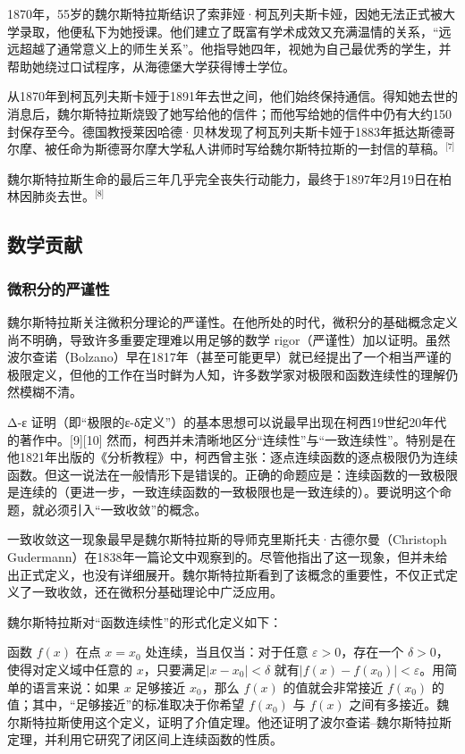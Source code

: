 1870年，55岁的魏尔斯特拉斯结识了索菲娅·柯瓦列夫斯卡娅，因她无法正式被大学录取，他便私下为她授课。他们建立了既富有学术成效又充满温情的关系，“远远超越了通常意义上的师生关系”。他指导她四年，视她为自己最优秀的学生，并帮助她绕过口试程序，从海德堡大学获得博士学位。

从1870年到柯瓦列夫斯卡娅于1891年去世之间，他们始终保持通信。得知她去世的消息后，魏尔斯特拉斯烧毁了她写给他的信件；而他写给她的信件中仍有大约150封保存至今。德国教授莱因哈德·贝林发现了柯瓦列夫斯卡娅于1883年抵达斯德哥尔摩、被任命为斯德哥尔摩大学私人讲师时写给魏尔斯特拉斯的一封信的草稿。\(^\text{[7]}\)

魏尔斯特拉斯生命的最后三年几乎完全丧失行动能力，最终于1897年2月19日在柏林因肺炎去世。\(^\text{[8]}\)
\subsection{数学贡献}
\subsubsection{微积分的严谨性}
魏尔斯特拉斯关注微积分理论的严谨性。在他所处的时代，微积分的基础概念定义尚不明确，导致许多重要定理难以用足够的数学 rigor（严谨性）加以证明。虽然波尔查诺（Bolzano）早在1817年（甚至可能更早）就已经提出了一个相当严谨的极限定义，但他的工作在当时鲜为人知，许多数学家对极限和函数连续性的理解仍然模糊不清。

Δ-ε 证明（即“极限的ε-δ定义”）的基本思想可以说最早出现在柯西19世纪20年代的著作中。[9][10] 然而，柯西并未清晰地区分“连续性”与“一致连续性”。特别是在他1821年出版的《分析教程》中，柯西曾主张：逐点连续函数的逐点极限仍为连续函数。但这一说法在一般情形下是错误的。正确的命题应是：连续函数的一致极限是连续的（更进一步，一致连续函数的一致极限也是一致连续的）。要说明这个命题，就必须引入“一致收敛”的概念。

一致收敛这一现象最早是魏尔斯特拉斯的导师克里斯托夫·古德尔曼（Christoph Gudermann）在1838年一篇论文中观察到的。尽管他指出了这一现象，但并未给出正式定义，也没有详细展开。魏尔斯特拉斯看到了该概念的重要性，不仅正式定义了一致收敛，还在微积分基础理论中广泛应用。

魏尔斯特拉斯对“函数连续性”的形式化定义如下：

函数 $f(x)$ 在点 $x = x_0$ 处连续，当且仅当：对于任意 $\varepsilon > 0$，存在一个 $\delta > 0$，使得对定义域中任意的 $x$，只要满足$|x - x_0| < \delta$
就有$|f(x) - f(x_0)| < \varepsilon$。用简单的语言来说：如果 $x$ 足够接近 $x_0$，那么 $f(x)$ 的值就会非常接近 $f(x_0)$ 的值；其中，“足够接近”的标准取决于你希望 $f(x_0)$ 与 $f(x)$ 之间有多接近。魏尔斯特拉斯使用这个定义，证明了介值定理。他还证明了波尔查诺–魏尔斯特拉斯定理，并利用它研究了闭区间上连续函数的性质。
